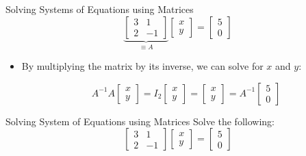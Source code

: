 \documentclass[aspectratio=43]{beamer}
\begin{document}
\begin{frame}{Solving Systems of Equations using Matrices}
  $$
    \underbrace{\begin{bmatrix} 3 & 1 \\ 2 & -1 \end{bmatrix}}_{\equiv A} \begin{bmatrix} x \\ y \end{bmatrix} = \begin{bmatrix} 5 \\ 0 \end{bmatrix}
  $$

  \begin{itemize}
    \item By multiplying the matrix by its inverse, we can solve for $x$ and $y$:

          $$A^{-1} A \begin{bmatrix} x \\ y \end{bmatrix} = I_2 \begin{bmatrix} x \\ y \end{bmatrix} = \begin{bmatrix} x \\ y \end{bmatrix} = A^{-1} \begin{bmatrix} 5 \\ 0 \end{bmatrix}$$
  \end{itemize}

  \vspace{50mm}

\end{frame}

\begin{frame}{Solving System of Equations using Matrices}
  Solve the following: $$
    \begin{bmatrix} 3 & 1 \\ 2 & -1 \end{bmatrix} \begin{bmatrix} x \\ y \end{bmatrix} = \begin{bmatrix} 5 \\ 0 \end{bmatrix}
  $$

  \vspace{50mm}
\end{frame}
\end{document}
